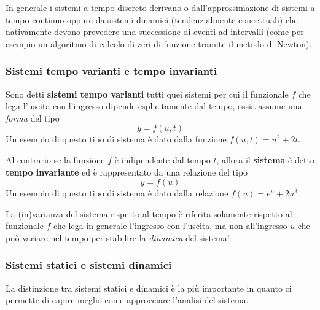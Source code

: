     	In generale i sistemi a tempo discreto derivano o dall'approssimazione di sistemi a tempo continuo oppure da sistemi dinamici (tendenzialmente concettuali) che nativamente devono prevedere una successione di eventi ad intervalli (come per esempio un algoritmo di calcolo di zeri di funzione tramite il metodo di Newton).
    	
    \subsubsection{Sistemi tempo varianti e tempo invarianti}
    	Sono detti \textbf{sistemi tempo varianti} tutti quei sistemi per cui il funzionale $f$ che lega l'uscita con l'ingresso dipende esplicitamente dal tempo, ossia assume una \textit{forma} del tipo
    	\[  y = f(u,t)\]
    	Un esempio di questo tipo di sistema è dato dalla funzione $f(u,t) = u^2 + 2t$.
    	
    	Al contrario se la funzione $f$ è indipendente dal tempo $t$, allora il \textbf{sistema} è detto \textbf{tempo invariante} ed è rappresentato da una relazione del tipo
    	\[ y = f(u) \]
    	Un esempio di questo tipo di sistema è dato dalla relazione $f(u) = e^u + 2u^3$.
    	
    	\begin{osservazione}
    		La (in)varianza del sistema rispetto al tempo è riferita solamente rispetto al funzionale $f$ che lega in generale l'ingresso con l'uscita, ma non all'ingresso $u$ che può variare nel tempo per stabilire la \textit{dinamica} del sistema!
    	\end{osservazione}
    
   	\subsubsection{Sistemi statici e sistemi dinamici}
   		La distinzione tra sistemi statici e dinamici è la più importante in quanto ci permette di capire meglio come approcciare l'analisi del sistema.
    	
